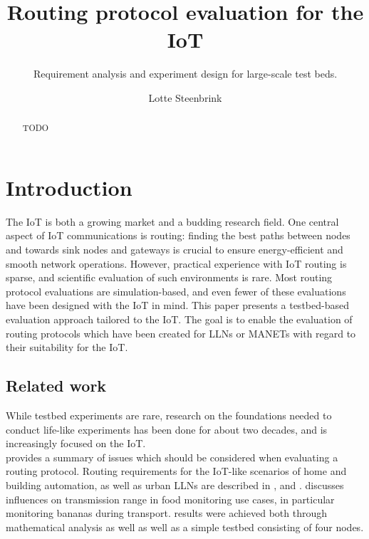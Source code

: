 \documentclass{acm_proc_article-sp}
\begin{document}
\title{Routing protocol evaluation for the IoT}
\subtitle{Requirement analysis and experiment design for large-scale test beds.}

\author{
\alignauthor
Lotte Steenbrink
}

\maketitle
\begin{abstract}
TODO
\end{abstract}


\section{Introduction}
\label{sec:Intro}
The \gls{IoT} is both a growing market and a budding research field. One central aspect of IoT communications is routing: finding the best paths between nodes and towards sink nodes and gateways is crucial to ensure energy-efficient and smooth network operations. However, practical experience with IoT routing is sparse, and scientific evaluation of such environments is rare. Most routing protocol evaluations are simulation-based, and even fewer of these evaluations have been designed with the IoT in mind.
This paper presents a testbed-based evaluation approach tailored to the IoT. The goal is to enable the evaluation of routing protocols which have been created for \glspl{LLN} or \glspl{MANET} with regard to their suitability for the IoT.


\subsection{Related work}
\label{subsec:related_work}
While testbed experiments are rare, research on the foundations needed to conduct life-like experiments has been done for about two decades, and is increasingly focused on the IoT.\\
\cite{RFC-2501} provides a summary of issues which should be considered when evaluating a routing protocol. Routing requirements for the IoT-like scenarios of home and building automation, as well as urban \glspl{LLN} are described in \cite{RFC-5826},  \cite{RFC-5867} and \cite{RFC-5548}.
\cite{food_monitoring} discusses influences on transmission range in food monitoring use cases, in particular monitoring bananas during transport. results were achieved both through mathematical analysis as well as well as a simple testbed consisting of four nodes.
\end{document}
